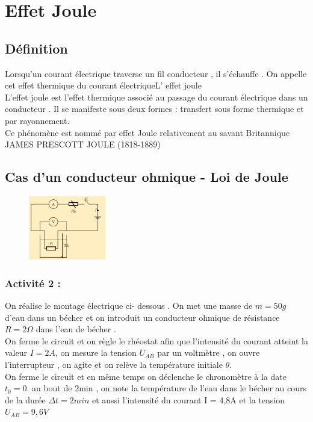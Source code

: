 \documentclass[12pt]{article}
\begin{document}
\section{Effet Joule}

\subsection{Définition}
Lorsqu’un courant électrique traverse un fil conducteur , il
s’échauffe . On appelle cet effet thermique du courant électriqueL’
effet joule
\\L’effet joule est l’effet thermique associé au passage du courant
électrique dans un conducteur . Il se manifeste sous deux formes :
transfert sous forme thermique et par rayonnement.
\\Ce phénomène est nommé par effet Joule relativement au savant
Britannique JAMES PRESCOTT JOULE (1818-1889)

\subsection{Cas d’un conducteur ohmique - Loi de Joule}
\begin{figure}
  \vspace{-1.5cm}
    \includegraphics[width=0.3\textwidth]{./img/img_02.png}
\end{figure}


\subsubsection{Activité 2 :}
On réalise le montage électrique ci- dessous .
On met une masse de $m = 50g$ d’eau dans un bécher et on
introduit un conducteur ohmique de résistance $R = 2\Omega$ dans l’eau
de bécher .
\\On ferme le circuit et on règle le rhéostat afin que l’intensité du
courant atteint la valeur $I = 2A$, on mesure la tension $U_{AB}$ par un
voltmètre , on ouvre l’interrupteur , on agite et on relève la
température initiale $\theta$.
\\On ferme le circuit et en même temps on déclenche le chronomètre
à la date $t_0 = 0$. au bout de 2min , on note la température de l’eau
dans le bécher au cours de la durée $\Delta{t} = 2min$ et aussi l’intensité
du courant I = 4,8A et la tension $U_{AB} = 9,6V$
\end{document}
